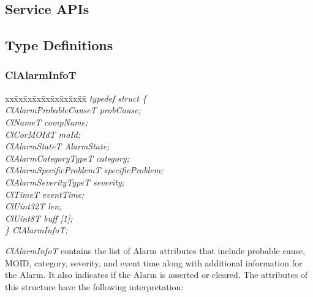 \begin{flushleft}
\chapter{Service APIs}

\section{Type Definitions}


\subsection{ClAlarmInfoT}
\label{Alarminfo}
\begin{tabbing}
xx\=xx\=xx\=xx\=xx\=xx\=xx\=xx\=xx\=\kill
\textit{typedef struct \{}\\
\>\>\>\>\textit{ClAlarmProbableCauseT probCause;}\\
\>\>\>\>\textit{ClNameT compName;}\\
\>\>\>\>\textit{ClCorMOIdT moId;}\\
\>\>\>\>\textit{ClAlarmStateT AlarmState;}\\
\>\>\>\>\textit{ClAlarmCategoryTypeT category;}\\
\>\>\>\>\textit{ClAlarmSpecificProblemT specificProblem;}\\
\>\>\>\>\textit{ClAlarmSeverityTypeT severity;}\\
\>\>\>\>\textit{ClTimeT eventTime;}\\
\>\>\>\>\textit{ClUint32T len;}\\
\>\>\>\>\textit{ClUint8T buff \mbox{[}1\mbox{]};}\\
\textit{\} ClAlarmInfoT;}\end{tabbing}
\textit{ClAlarmInfoT} contains the list of Alarm attributes that include probable cause, MOID,
category, severity, and event time along with additional information for the Alarm. It
also indicates if the Alarm is asserted or cleared. The attributes of this structure have the following interpretation:
\begin{itemize}


\end{itemize}
\end{flushleft}
